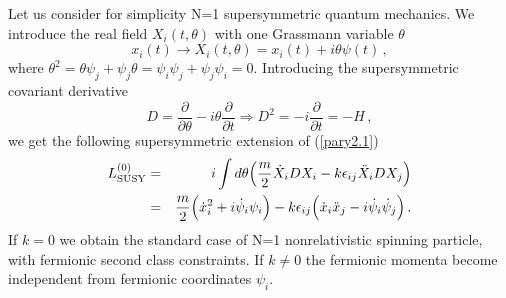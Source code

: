 \documentclass[a4paper,12pt]{article}
\begin{document}
Let us consider for simplicity N=1 supersymmetric quantum
mechanics. We introduce the real field $X_i(t,\theta)$ with one
Grassmann variable $\theta$
\begin{equation}\label{pary2.12}
  x_i (t) \longrightarrow X_i(t, \theta) = x_i (t) + i \theta
   \psi(t)\, ,
\end{equation}
where $\theta^2
 =  \theta \psi_j +
  \psi_j \theta  
 =
   \psi_i \psi_j  + \psi_j \psi_i =0$.
Introducing  the supersymmetric covariant derivative
\begin{equation}\label{pary2.13}
  D = \frac{\partial}{\partial \theta} - i \theta
  \frac{\partial }{\partial t}
  \Rightarrow D^2 = - i \frac{\partial }{\partial t}= - H\, ,
\end{equation}
we get the following supersymmetric extension of  (\ref{pary2.1})
\begin{eqnarray}\label{pary2.14}
L^{(0)}_{\rm SUSY} &= &i \int d\theta \Big( \frac{m}{2} \dot{X}_i
DX_i - k \epsilon_{ij} \ddot{X}_i DX_j  \Big) \cr &= & \frac{m}{2}
\Big( \dot{x}^2_i + i \dot{\psi}_i \psi_i \Big) - k
\epsilon_{ij}\Big( \dot{x}_i \ddot{x}_j - i \dot{\psi}_i
\dot{\psi}_j \Big)\, .
\end{eqnarray}
If $k=0$ we obtain the standard case of N=1 nonrelativistic spinning
particle, with fermionic second class constraints. If $k\neq 0$
the fermionic
 momenta become independent from fermionic
 coordinates $\psi_i$.
 
\end{document}
